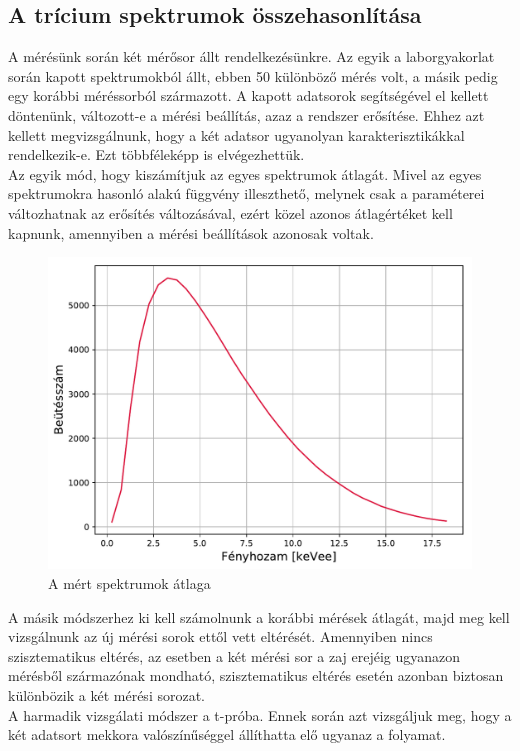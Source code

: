 \documentclass[12pt,a4paper]{article}
\begin{document}
\subsection{A trícium spektrumok összehasonlítása}
\hspace*{10pt} A mérésünk során két mérősor állt rendelkezésünkre. Az egyik a laborgyakorlat során kapott spektrumokból állt, ebben 50 különböző mérés volt, a másik pedig egy korábbi méréssorból származott. A kapott adatsorok segítségével el kellett döntenünk, változott-e a mérési beállítás, azaz a rendszer erősítése. Ehhez azt kellett megvizsgálnunk, hogy a két adatsor ugyanolyan karakterisztikákkal rendelkezik-e. Ezt többféleképp is elvégezhettük.\\
\hspace*{10pt} Az egyik mód, hogy kiszámítjuk az egyes spektrumok átlagát. Mivel az egyes spektrumokra hasonló alakú függvény illeszthető, melynek csak a paraméterei változhatnak az erősítés változásával, ezért közel azonos átlagértéket kell kapnunk, amennyiben a mérési beállítások azonosak voltak.\\
\begin{figure}[!h]
\centering
\includegraphics[width=0.8\linewidth ]{beta}
\caption{A mért spektrumok átlaga}
\end{figure}
\newpage
\hspace*{10pt} A másik módszerhez ki kell számolnunk a korábbi mérések átlagát, majd meg kell vizsgálnunk az új mérési sorok ettől vett eltérését. Amennyiben nincs szisztematikus eltérés, az esetben a két mérési sor a zaj erejéig ugyanazon mérésből származónak mondható, szisztematikus eltérés esetén azonban biztosan különbözik a két mérési sorozat.\\
\hspace*{10pt} A harmadik vizsgálati módszer a t-próba. Ennek során azt vizsgáljuk meg, hogy a két adatsort mekkora valószínűséggel állíthatta elő ugyanaz a folyamat.\\
\end{document}
